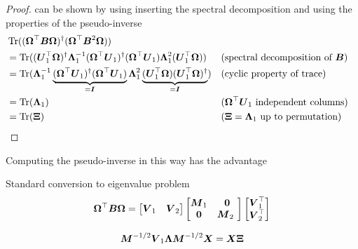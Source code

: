 \begin{proof}
     can be shown by using inserting the
    spectral decomposition 
    and using the properties of the pseudo-inverse
    \begin{align*}
        &\operatorname{Tr}((\boldsymbol{\Omega}^{\top} \boldsymbol{B} \boldsymbol{\Omega})^{\dagger}(\boldsymbol{\Omega}^{\top} \boldsymbol{B}^2 \boldsymbol{\Omega})) \notag \\
            &= \operatorname{Tr}((\boldsymbol{U}_1^{\top} \boldsymbol{\Omega})^{\dagger} \boldsymbol{\Lambda}_1^{-1} (\boldsymbol{\Omega}^{\top} \boldsymbol{U}_1)^{\dagger} (\boldsymbol{\Omega}^{\top} \boldsymbol{U}_1) \boldsymbol{\Lambda}_1^2 (\boldsymbol{U}_1^{\top} \boldsymbol{\Omega})) &&\text{(spectral decomposition of $\boldsymbol{B}$)} \notag \\
            &= \operatorname{Tr}(\boldsymbol{\Lambda}_1^{-1} \underbrace{(\boldsymbol{\Omega}^{\top} \boldsymbol{U}_1)^{\dagger} (\boldsymbol{\Omega}^{\top} \boldsymbol{U}_1)}_{=\boldsymbol{I}} \boldsymbol{\Lambda}_1^2 \underbrace{(\boldsymbol{U}_1^{\top} \boldsymbol{\Omega}) (\boldsymbol{U}_1^{\top} \boldsymbol{\Omega})^{\dagger}}_{=\boldsymbol{I}}) &&\text{(cyclic property of trace)} \notag \\
            &= \operatorname{Tr}(\boldsymbol{\Lambda}_1) &&\text{($\boldsymbol{\Omega}^{\top} \boldsymbol{U}_1$ independent columns)}  \notag \\
            &= \operatorname{Tr}(\boldsymbol{\Xi}) &&\text{($\boldsymbol{\Xi} = \boldsymbol{\Lambda}_1$ up to permutation)}
    \end{align*}
\end{proof}

Computing the pseudo-inverse in this way has the advantage 


Standard conversion to eigenvalue problem
\begin{equation}
    \mtx{\Omega}^{\top} \mtx{B} \mtx{\Omega} = \begin{bmatrix} \mtx{V}_1 & \mtx{V}_2 \end{bmatrix} 
    \begin{bmatrix} \mtx{M}_1 & \mtx{0} \\ \mtx{0} & \mtx{M}_2 \ \end{bmatrix} 
    \begin{bmatrix} \mtx{V}_1^{\top} \\ \mtx{V}_2^{\top} \end{bmatrix}
\end{equation}

\begin{equation}
    \boldsymbol{M}^{-1/2} \boldsymbol{V}_1 \boldsymbol{\Lambda} \boldsymbol{M}^{-1/2} \boldsymbol{X} = \boldsymbol{X} \boldsymbol{\Xi}
    \label{equ:converted-generalized-eigenvalue-problem}
\end{equation}

